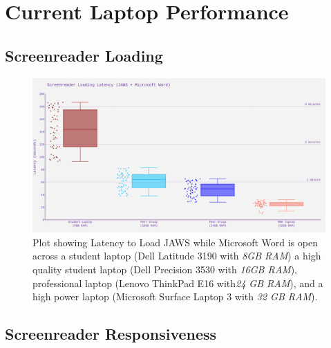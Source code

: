 \documentclass[14pt,letterpaper,twoside]{extreport}
\begin{document}
\pagebreak \hypertarget{current-laptop-performance-measured}{%
	\section{Current Laptop Performance}\label{current-laptop-performance-measured}}
\hypertarget{screenreader-loading}{%
	\subsection{Screenreader Loading}\label{screenreader-loading}}
\begin{figure}[!h]
	\centering
	\includegraphics[width=\textwidth]{images/ComputerRBDisplaySpecsTVIFig1.png}
	\caption[Latency to Load JAWS]{Plot showing Latency to Load JAWS while Microsoft Word is open across a student laptop (Dell Latitude 3190 with \textit{8GB RAM}) a high quality student laptop (Dell Precision 3530 with \textit{16GB RAM}), professional laptop (Lenovo ThinkPad E16 with\textit{24 GB RAM}), and a high power laptop (Microsoft Surface Laptop 3 with \textit{32 GB RAM}).}
	\label{fig:figure 1}
\end{figure}

\pagebreak
\pagebreak
\hypertarget{screenreader-response}{%
	\subsection{Screenreader Responsiveness}\label{screenreader-response}}
\end{document}
